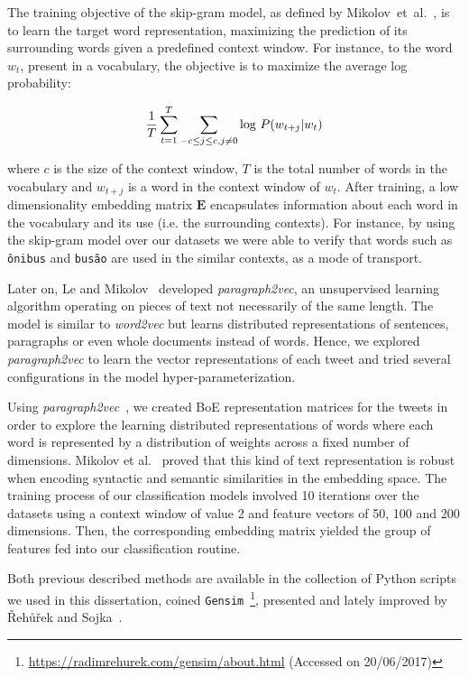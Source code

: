 The training objective of the skip-gram model, as defined by Mikolov~et~al.~\cite{mikolov2013linguistic}, is to learn the target word representation, maximizing the prediction of its surrounding words given a predefined context window. For instance, to the word $w_t$, present in a vocabulary, the objective is to maximize the average log probability:

\begin{equation}
\frac{1}{T}  \sum_{t=1}^{T}  \sum_{-c \leq j \leq  c, j \neq 0} \textnormal{log } P(w_{t+j} | w_t)
\end{equation}

where $c$ is the size of the context window, $T$ is the total number of words in the vocabulary and $w_{t+j}$ is a word in the context window of $w_t$. After training, a low dimensionality embedding matrix $\textbf{E}$ encapsulates information about each word in the vocabulary and its use (i.e. the surrounding contexts). For instance, by using the skip-gram model over our datasets we were able to verify that words such as \texttt{ônibus} and \texttt{busão} are used in the similar contexts, as a mode of transport.

Later on, Le and Mikolov~\cite{le2014distributed} developed \emph{paragraph2vec}, an unsupervised learning algorithm operating on pieces of text not necessarily of the same length. The model is similar to \emph{word2vec} but learns distributed representations of sentences, paragraphs or even whole documents instead of words. Hence, we explored \emph{paragraph2vec} to learn the vector representations of each tweet and tried several configurations in the model hyper-parameterization.

Using \textit{paragraph2vec}~\cite{le2014distributed}, we created \gls{BoE} representation matrices for the tweets in order to explore the learning distributed representations of words where each word is represented by a distribution of weights across a fixed number of dimensions. Mikolov et al.~\cite{mikolov2013linguistic} proved that this kind of text representation is robust when encoding syntactic and semantic similarities in the embedding space. The training process of our classification models involved 10 iterations over the datasets using a context window of value 2 and feature vectors of 50, 100 and 200 dimensions. Then, the corresponding embedding matrix yielded the group of features fed into our classification routine.

Both previous described methods are available in the collection of Python scripts we used in this dissertation, coined \texttt{Gensim}~\footnote{\url{https://radimrehurek.com/gensim/about.html} (Accessed on 20/06/2017)}, presented and lately improved by \v{R}eh\r{u}\v{r}ek and Sojka~\cite{rehurek2010software}.

